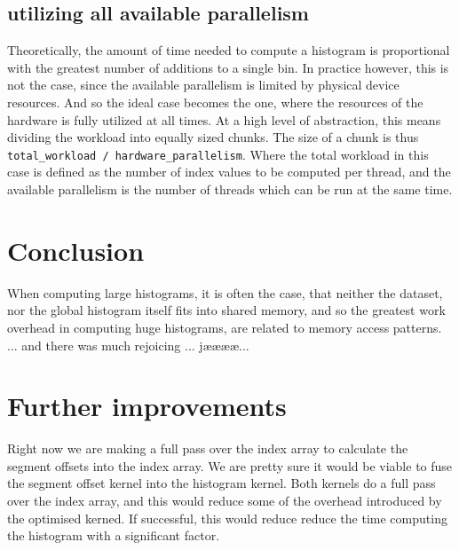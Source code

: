 \documentclass[12pt, a4paper, hidelinks]{article}
\renewcommand{\tt}[1]{\texttt{#1}}
\begin{document}

\subsection{utilizing all available parallelism}
Theoretically, the amount of time needed to compute a histogram is
proportional with the greatest number of additions to a single bin.
In practice however, this is not the case,
since the available parallelism is limited by physical device resources.
And so the ideal case becomes the one,
where the resources of the hardware is fully utilized at all times.
At a high level of abstraction, this means dividing the workload into
equally sized chunks. The size of a chunk is thus
\tt{total\_workload / hardware\_parallelism}.
Where the total workload in this case is defined as the number of index values
to be computed per thread, and the available parallelism is the number of
threads which can be run at the same time.

\section{Conclusion}
When computing large histograms,
it is often the case, that neither the dataset,
nor the global histogram itself fits into shared memory,
and so the greatest work overhead in computing huge histograms,
are related to memory access patterns. ... and there was much rejoicing ... jææææ...

\section{Further improvements}
Right now we are making a full pass over the index array to calculate
the segment offsets into the index array.
We are pretty sure it would be viable to fuse the segment offset
kernel into the histogram kernel.
Both kernels do a full pass over the index array,
and this would reduce some of the overhead introduced
by the optimised kerned. If successful,
this would reduce reduce the time computing the histogram with a significant factor.


\end{document}
